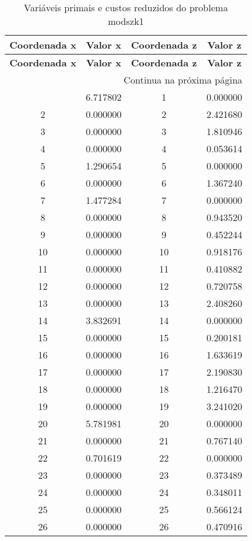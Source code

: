 \documentclass[12pt]{article}
\begin{document}
\begin{longtable}{@{}cccc@{}}
\caption{Variáveis primais e custos reduzidos do problema modszk1} \\
\toprule
\textbf{Coordenada x} & \textbf{Valor x} & \textbf{Coordenada z} & \textbf{Valor z} \\
\midrule
\endfirsthead

\toprule
\textbf{Coordenada x} & \textbf{Valor x} & \textbf{Coordenada z} & \textbf{Valor z} \\
\midrule
\endhead

\midrule \multicolumn{4}{r}{{Continua na próxima página}} \\ \midrule
\endfoot

\bottomrule
\endlastfoot
1 & 6.717802 & 1 & 0.000000 \\
2 & 0.000000 & 2 & 2.421680 \\
3 & 0.000000 & 3 & 1.810946 \\
4 & 0.000000 & 4 & 0.053614 \\
5 & 1.290654 & 5 & 0.000000 \\
6 & 0.000000 & 6 & 1.367240 \\
7 & 1.477284 & 7 & 0.000000 \\
8 & 0.000000 & 8 & 0.943520 \\
9 & 0.000000 & 9 & 0.452244 \\
10 & 0.000000 & 10 & 0.918176 \\
11 & 0.000000 & 11 & 0.410882 \\
12 & 0.000000 & 12 & 0.720758 \\
13 & 0.000000 & 13 & 2.408260 \\
14 & 3.832691 & 14 & 0.000000 \\
15 & 0.000000 & 15 & 0.200181 \\
16 & 0.000000 & 16 & 1.633619 \\
17 & 0.000000 & 17 & 2.190830 \\
18 & 0.000000 & 18 & 1.216470 \\
19 & 0.000000 & 19 & 3.241020 \\
20 & 5.781981 & 20 & 0.000000 \\
21 & 0.000000 & 21 & 0.767140 \\
22 & 0.701619 & 22 & 0.000000 \\
23 & 0.000000 & 23 & 0.373489 \\
24 & 0.000000 & 24 & 0.348011 \\
25 & 0.000000 & 25 & 0.566124 \\
26 & 0.000000 & 26 & 0.470916 \\

\end{longtable}
\end{document}
